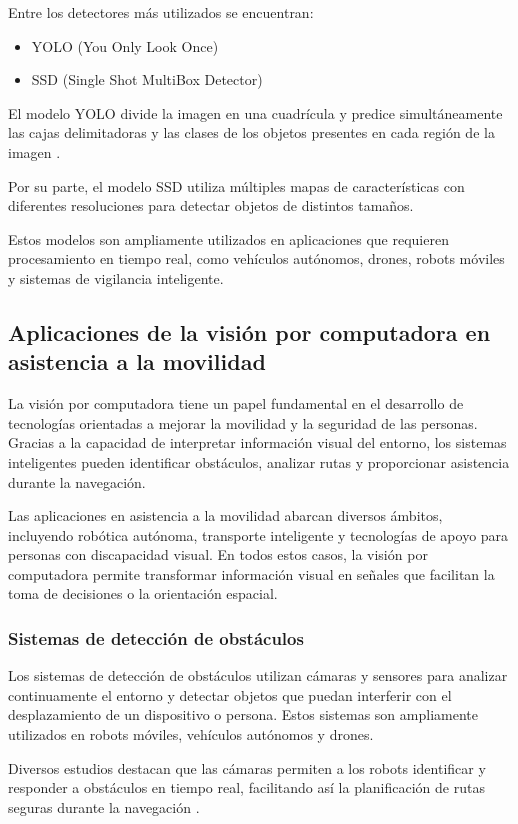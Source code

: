 Entre los detectores más utilizados se encuentran:
\begin{itemize}
    \item YOLO (You Only Look Once)
    \item SSD (Single Shot MultiBox Detector)
\end{itemize}

El modelo YOLO divide la imagen en una cuadrícula y predice simultáneamente las cajas delimitadoras y las clases de los objetos presentes en cada región de la imagen \cite{geeksforgeeks_object_detection}.

Por su parte, el modelo SSD utiliza múltiples mapas de características con diferentes resoluciones para detectar objetos de distintos tamaños.

Estos modelos son ampliamente utilizados en aplicaciones que requieren procesamiento en tiempo real, como vehículos autónomos, drones, robots móviles y sistemas de vigilancia inteligente.

\subsection{Aplicaciones de la visión por computadora en asistencia a la movilidad}
La visión por computadora tiene un papel fundamental en el desarrollo de tecnologías orientadas a mejorar la movilidad y la seguridad de las personas. Gracias a la capacidad de interpretar información visual del entorno, los sistemas inteligentes pueden identificar obstáculos, analizar rutas y proporcionar asistencia durante la navegación.

Las aplicaciones en asistencia a la movilidad abarcan diversos ámbitos, incluyendo robótica autónoma, transporte inteligente y tecnologías de apoyo para personas con discapacidad visual. En todos estos casos, la visión por computadora permite transformar información visual en señales que facilitan la toma de decisiones o la orientación espacial.

\subsubsection{Sistemas de detección de obstáculos}
Los sistemas de detección de obstáculos utilizan cámaras y sensores para analizar continuamente el entorno y detectar objetos que puedan interferir con el desplazamiento de un dispositivo o persona. Estos sistemas son ampliamente utilizados en robots móviles, vehículos autónomos y drones.

Diversos estudios destacan que las cámaras permiten a los robots identificar y responder a obstáculos en tiempo real, facilitando así la planificación de rutas seguras durante la navegación \cite{mrdvs_robot_cameras}.

